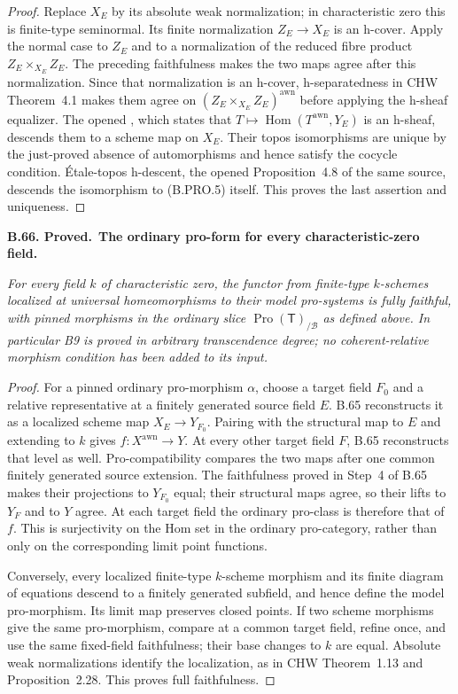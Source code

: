 \documentclass[11pt,a4paper]{article}
\newenvironment{claim}[3]{\par\medskip\noindent\hypertarget{#1}{\textbf{#1. #2.}}\ \textbf{#3.}\par\nopagebreak\smallskip\begingroup\itshape}{\endgroup\par\smallskip}
\begin{document}
\begin{proof}
Replace \(X_E\) by its absolute weak normalization; in
characteristic zero this is finite-type seminormal. Its finite
normalization \(Z_E\to X_E\) is an h-cover. Apply the normal
case to \(Z_E\) and to a normalization of the reduced fibre
product \(Z_E\times_{X_E}Z_E\). The preceding faithfulness
makes the two maps agree after this normalization. Since that
normalization is an h-cover, h-separatedness in CHW Theorem~4.1
makes them agree on \((Z_E\times_{X_E}Z_E)^{\mathrm{awn}}\)
before applying the h-sheaf equalizer. The opened
\citep[Theorem~4.1]{CarlsonHaineWolf2024}, which states that
\(T\mapsto\operatorname{Hom}(T^{\mathrm{awn}},Y_E)\)
is an h-sheaf, descends them to a scheme map on \(X_E\).
Their topos isomorphisms are unique by the just-proved absence
of automorphisms and hence satisfy the cocycle condition.
Étale-topos h-descent, the opened Proposition~4.8 of the same
source, descends the isomorphism to (B.PRO.5) itself. This proves
the last assertion and uniqueness.
\end{proof}

\begin{claim}{B.66}{Proved}{The ordinary pro-form for every characteristic-zero field}
For every field \(k\) of characteristic zero, the functor from
finite-type \(k\)-schemes localized at universal homeomorphisms
to their model pro-systems is fully faithful, with pinned
morphisms in the ordinary slice
\(\operatorname{Pro}(\mathsf T)_{/\mathcal B}\) as defined
above. In particular B9 is proved in arbitrary transcendence
degree; no coherent-relative morphism condition has been added
to its input.
\end{claim}
\begin{proof}
For a pinned ordinary pro-morphism \(\alpha\), choose a target
field \(F_0\) and a relative representative at a finitely
generated source field \(E\). B.65 reconstructs it as a
localized scheme map \(X_E\to Y_{F_0}\). Pairing with the
structural map to \(E\) and extending to \(k\) gives
\(f:X^{\mathrm{awn}}\to Y\). At every other target field
\(F\), B.65 reconstructs that level as well. Pro-compatibility
compares the two maps after one common finitely generated
source extension. The faithfulness proved in Step~4 of B.65
makes their projections to \(Y_{F_0}\) equal; their structural
maps agree, so their lifts to \(Y_F\) and to \(Y\) agree.
At each target field the ordinary pro-class is therefore that
of \(f\). This is surjectivity on the Hom set in the ordinary
pro-category, rather than only on the corresponding limit
point functions.

Conversely, every localized finite-type \(k\)-scheme morphism
and its finite diagram of equations descend to a finitely
generated subfield, and hence define the model pro-morphism.
Its limit map preserves closed points. If two scheme morphisms
give the same pro-morphism, compare at a common target field,
refine once, and use the same fixed-field faithfulness; their
base changes to \(k\) are equal. Absolute weak normalizations
identify the localization, as in CHW Theorem~1.13 and
Proposition~2.28. This proves full faithfulness.
\end{proof}
\end{document}
